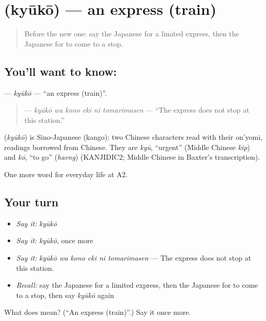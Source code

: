 \section[\texorpdfstring{\ja{きゅうこう} (kyūkō)}{きゅうこう (kyūkō)}]{ (kyūkō) — an express (train)}

\label{lesson:JA-C199-kyuukou}



\begin{quote}
Before the new one: say the Japanese for a limited express, then the Japanese for to come to a stop.
\end{quote}

\subsection*{You'll want to know: }
\textbf{} — \emph{kyūkō} — \textquotedblleft{}an express (train)\textquotedblright{}.

\begin{quote}
\textbf{   } — \emph{kyūkō wa kono eki ni tomarimasen} — \textquotedblleft{}The express does not stop at this station.\textquotedblright{}
\end{quote}

\begin{cousinweb}
\textbf{} (\emph{kyūkō}) is Sino-Japanese (kango): two Chinese characters read with their on'yomi, readings borrowed from Chinese. They are \emph{kyū}, \textquotedblleft{}urgent\textquotedblright{} (Middle Chinese \emph{kip}) and \emph{kō}, \textquotedblleft{}to go\textquotedblright{} (\emph{haeng}) (KANJIDIC2; Middle Chinese in Baxter's transcription).
\end{cousinweb}

\begin{grammarlens}[title={What you've built}]
One more word for everyday life at A2.
\end{grammarlens}

\subsection*{Your turn}
\begin{itemize}
\raggedright
  \item \emph{Say it:} \emph{kyūkō}
  \item \emph{Say it:} \emph{kyūkō}, once more
  \item \emph{Say it:} \emph{kyūkō wa kono eki ni tomarimasen} — The express does not stop at this station.
  \item \emph{Recall:} say the Japanese for a limited express, then the Japanese for to come to a stop, then say \emph{kyūkō} again
\end{itemize}

\begin{tcolorbox}[breakable,colback=teal!4,colframe=teal!35!black,title={Before you move on}]
What does  mean? (\textquotedblleft{}An express (train)\textquotedblright{}.) Say it once more.
\end{tcolorbox}
